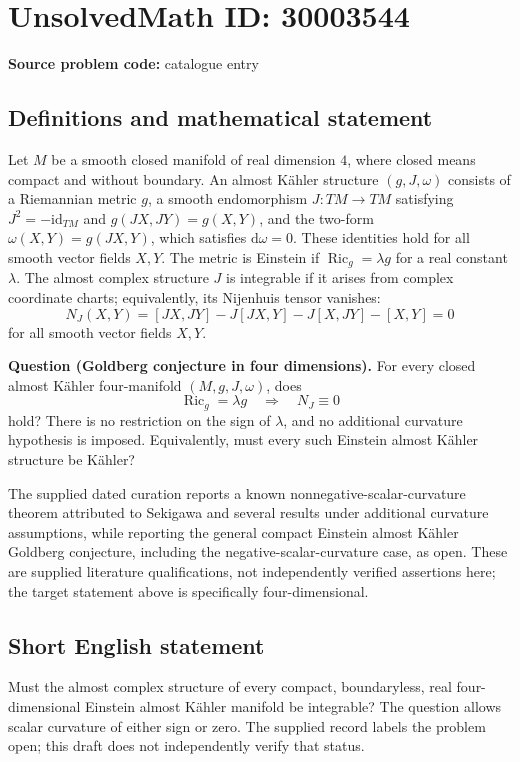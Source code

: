 \documentclass[11pt]{article}
\begin{document}
\section*{UnsolvedMath ID: 30003544}
\textbf{Source problem code:} catalogue entry
\subsection{Definitions and mathematical statement}
Let \(M\) be a smooth closed manifold of real dimension \(4\), where closed means compact and without boundary. An almost Kähler structure \((g,J,\omega)\) consists of a Riemannian metric \(g\), a smooth endomorphism \(J:TM\to TM\) satisfying \(J^2=-\mathrm{id}_{TM}\) and \(g(JX,JY)=g(X,Y)\), and the two-form \(\omega(X,Y)=g(JX,Y)\), which satisfies \(\mathrm{d}\omega=0\). These identities hold for all smooth vector fields \(X,Y\). The metric is Einstein if \(\operatorname{Ric}_g=\lambda g\) for a real constant \(\lambda\). The almost complex structure \(J\) is integrable if it arises from complex coordinate charts; equivalently, its Nijenhuis tensor vanishes:
\[
N_J(X,Y)=[JX,JY]-J[JX,Y]-J[X,JY]-[X,Y]=0
\]
for all smooth vector fields \(X,Y\).

\textbf{Question (Goldberg conjecture in four dimensions).} For every closed almost Kähler four-manifold \((M,g,J,\omega)\), does
\[
\operatorname{Ric}_g=\lambda g\quad\Longrightarrow\quad N_J\equiv 0
\]
hold? There is no restriction on the sign of \(\lambda\), and no additional curvature hypothesis is imposed. Equivalently, must every such Einstein almost Kähler structure be Kähler?

The supplied dated curation reports a known nonnegative-scalar-curvature theorem attributed to Sekigawa and several results under additional curvature assumptions, while reporting the general compact Einstein almost Kähler Goldberg conjecture, including the negative-scalar-curvature case, as open. These are supplied literature qualifications, not independently verified assertions here; the target statement above is specifically four-dimensional.
\subsection{Short English statement}
Must the almost complex structure of every compact, boundaryless, real four-dimensional Einstein almost Kähler manifold be integrable? The question allows scalar curvature of either sign or zero. The supplied record labels the problem open; this draft does not independently verify that status.
\end{document}
